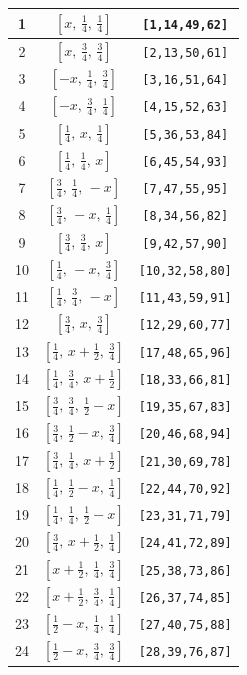 \documentclass[fleqn,8pt]{jsarticle}
\begin{document}
\begin{longtable}{ccc}
1 & $\left[ x,\, \frac{1}{4},\, \frac{1}{4} \right]$ & {\tt [1,14,49,62]} \\ \hline
2 & $\left[ x,\, \frac{3}{4},\, \frac{3}{4} \right]$ & {\tt [2,13,50,61]} \\ \hline
3 & $\left[ - x,\, \frac{1}{4},\, \frac{3}{4} \right]$ & {\tt [3,16,51,64]} \\ \hline
4 & $\left[ - x,\, \frac{3}{4},\, \frac{1}{4} \right]$ & {\tt [4,15,52,63]} \\ \hline
5 & $\left[ \frac{1}{4},\, x,\, \frac{1}{4} \right]$ & {\tt [5,36,53,84]} \\ \hline
6 & $\left[ \frac{1}{4},\, \frac{1}{4},\, x \right]$ & {\tt [6,45,54,93]} \\ \hline
7 & $\left[ \frac{3}{4},\, \frac{1}{4},\, - x \right]$ & {\tt [7,47,55,95]} \\ \hline
8 & $\left[ \frac{3}{4},\, - x,\, \frac{1}{4} \right]$ & {\tt [8,34,56,82]} \\ \hline
9 & $\left[ \frac{3}{4},\, \frac{3}{4},\, x \right]$ & {\tt [9,42,57,90]} \\ \hline
10 & $\left[ \frac{1}{4},\, - x,\, \frac{3}{4} \right]$ & {\tt [10,32,58,80]} \\ \hline
11 & $\left[ \frac{1}{4},\, \frac{3}{4},\, - x \right]$ & {\tt [11,43,59,91]} \\ \hline
12 & $\left[ \frac{3}{4},\, x,\, \frac{3}{4} \right]$ & {\tt [12,29,60,77]} \\ \hline
13 & $\left[ \frac{1}{4},\, x + \frac{1}{2},\, \frac{3}{4} \right]$ & {\tt [17,48,65,96]} \\ \hline
14 & $\left[ \frac{1}{4},\, \frac{3}{4},\, x + \frac{1}{2} \right]$ & {\tt [18,33,66,81]} \\ \hline
15 & $\left[ \frac{3}{4},\, \frac{3}{4},\, \frac{1}{2} - x \right]$ & {\tt [19,35,67,83]} \\ \hline
16 & $\left[ \frac{3}{4},\, \frac{1}{2} - x,\, \frac{3}{4} \right]$ & {\tt [20,46,68,94]} \\ \hline
17 & $\left[ \frac{3}{4},\, \frac{1}{4},\, x + \frac{1}{2} \right]$ & {\tt [21,30,69,78]} \\ \hline
18 & $\left[ \frac{1}{4},\, \frac{1}{2} - x,\, \frac{1}{4} \right]$ & {\tt [22,44,70,92]} \\ \hline
19 & $\left[ \frac{1}{4},\, \frac{1}{4},\, \frac{1}{2} - x \right]$ & {\tt [23,31,71,79]} \\ \hline
20 & $\left[ \frac{3}{4},\, x + \frac{1}{2},\, \frac{1}{4} \right]$ & {\tt [24,41,72,89]} \\ \hline
21 & $\left[ x + \frac{1}{2},\, \frac{1}{4},\, \frac{3}{4} \right]$ & {\tt [25,38,73,86]} \\ \hline
22 & $\left[ x + \frac{1}{2},\, \frac{3}{4},\, \frac{1}{4} \right]$ & {\tt [26,37,74,85]} \\ \hline
23 & $\left[ \frac{1}{2} - x,\, \frac{1}{4},\, \frac{1}{4} \right]$ & {\tt [27,40,75,88]} \\ \hline
24 & $\left[ \frac{1}{2} - x,\, \frac{3}{4},\, \frac{3}{4} \right]$ & {\tt [28,39,76,87]} \\
\end{longtable}
\end{document}
